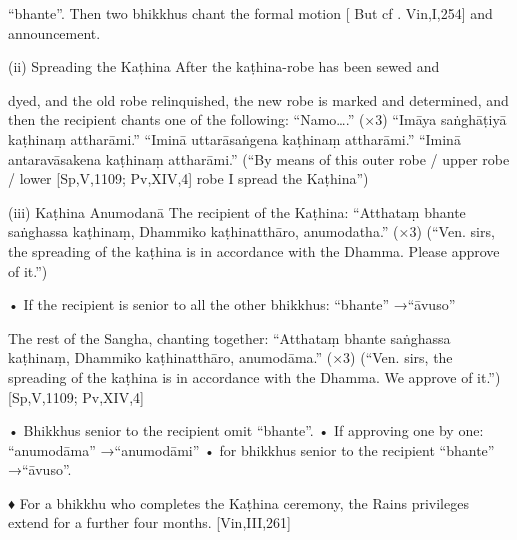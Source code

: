 “bhante”.
Then two bhikkhus chant the formal motion
[ But cf . Vin,I,254]
and announcement.

(ii) Spreading the Kaṭhina
After the kaṭhina-robe has been sewed and

dyed, and the old robe relinquished, the new
robe is marked and determined, and then the
recipient chants one of the following:
“Namo….” (×3)
“Imāya saṅghāṭiyā kaṭhinaṃ attharāmi.”
“Iminā uttarāsaṅgena kaṭhinaṃ attharāmi.”
“Iminā antaravāsakena kaṭhinaṃ attharāmi.”
(“By means of this outer robe / upper robe / lower
[Sp,V,1109; Pv,XIV,4]
robe I spread the Kaṭhina”)

(iii) Kaṭhina Anumodanā
The recipient of the Kaṭhina:
“Atthataṃ bhante saṅghassa kaṭhinaṃ,
Dhammiko kaṭhinatthāro, anumodatha.” (×3)
(“Ven. sirs, the spreading of the kaṭhina is in
accordance with the Dhamma. Please approve of it.”)

• If the recipient is senior to all the other
bhikkhus:
“bhante” →“āvuso”

The rest of the Sangha, chanting together:
“Atthataṃ bhante saṅghassa kaṭhinaṃ,
Dhammiko kaṭhinatthāro, anumodāma.” (×3)
(“Ven. sirs, the spreading of the kaṭhina is in
accordance with the Dhamma. We approve of it.”)
[Sp,V,1109; Pv,XIV,4]

• Bhikkhus senior to the recipient omit “bhante”.
• If approving one by one:
“anumodāma” →“anumodāmi”
• for bhikkhus senior to the recipient
“bhante” →“āvuso”.

♦ For a bhikkhu who completes the Kaṭhina
ceremony, the Rains privileges extend for a
further four months.
[Vin,III,261]

